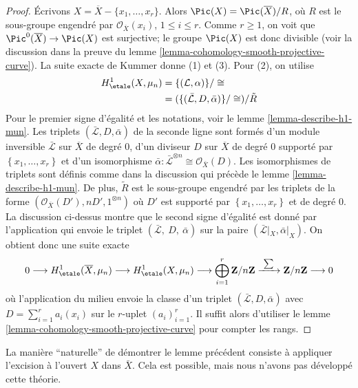 \begin{proof}
\'Ecrivons $X = \overline{X} - \{ x_1, \ldots, x_r\}$. Alors
$\Pic(X) = \Pic(\overline{X})/ R$, où $R$ est le sous-groupe engendré par
$\mathcal{O}_{\overline{X}}(x_i)$, $1 \leq i \leq r$.
Comme $r \geq 1$, on voit que $\Pic^0(\overline{X}) \to \Pic(X)$
est surjective; le groupe $\Pic(X)$ est donc divisible (voir la discussion dans la preuve
du lemme \ref{lemma-cohomology-smooth-projective-curve}).
La suite exacte de Kummer donne (1) et (3). Pour (2), on utilise
\begin{align*}
H_\etale^1(X, \mu_n)
& =
\{(\mathcal L, \alpha)\}/\cong \\
& =
(\{(\bar{\mathcal L}, D, \bar \alpha)\}/\cong)/\tilde{R}
\end{align*}
Pour le premier signe d'égalité et les notations, voir le lemme \ref{lemma-describe-h1-mun}.
Les triplets $(\bar{\mathcal L}, D, \bar \alpha)$ de la seconde ligne
sont formés d'un module inversible $\bar{\mathcal L}$ sur $\overline{X}$
de degré $0$, d'un diviseur $D$ sur $\overline{X}$ de degré $0$ supporté par
$\left\{x_1, \ldots, x_r\right\}$ et d'un isomorphisme
$\bar{\alpha}: \bar{\mathcal L}^{\otimes n} \cong \mathcal{O}_{\bar{X}}(D)$.
Les isomorphismes de triplets sont définis comme dans la discussion qui précède le
lemme \ref{lemma-describe-h1-mun}.
De plus, $\tilde{R}$ est le sous-groupe engendré par les triplets de la forme
$(\mathcal{O}_{\overline{X}}(D'), n D', 1^{\otimes n})$
où $D'$ est supporté par $\left\{x_1, \ldots, x_r\right\}$ et de degré 0.
La discussion ci-dessus montre que le second signe d'égalité est donné par
l'application qui envoie le triplet $(\bar{\mathcal L},\ D,\ \bar \alpha)$
sur la paire $(\bar{\mathcal L}|_X, \bar \alpha|_X)$. On obtient donc
une suite exacte
$$
0 \longrightarrow
H_\etale^1(\overline{X}, \mu_n) \longrightarrow
H_\etale^1(X, \mu_n) \longrightarrow
\bigoplus_{i = 1}^r \mathbf{Z}/n\mathbf{Z}
\xrightarrow{\ \sum\ }
\mathbf{Z}/n\mathbf{Z} \longrightarrow 0
$$
où l'application du milieu envoie la classe d'un triplet
$(\bar{ \mathcal L}, D, \bar \alpha)$ avec $D = \sum_{i = 1}^r a_i (x_i)$
sur le $r$-uplet $(a_i)_{i = 1}^r$. Il suffit alors d'utiliser le
lemme \ref{lemma-cohomology-smooth-projective-curve}
pour compter les rangs.
\end{proof}

\begin{remark}
\label{remark-natural-proof}
La manière ``naturelle'' de démontrer le lemme précédent consiste à appliquer l'excision à l'ouvert $X$ dans $\bar
X$. Cela est possible, mais nous n'avons pas développé cette théorie.
\end{remark}

